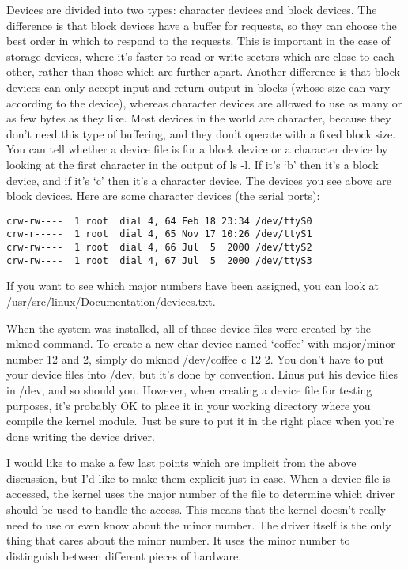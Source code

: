 \documentclass[10pt, oneside]{book}
\begin{document}
\begin{enumerate}
Devices are divided into two types: character devices and block devices. The difference is that block devices have a buffer for requests, so they can choose the best order in which to respond to the requests. This is important in the case of storage devices, where it's faster to read or write sectors which are close to each other, rather than those which are further apart. Another difference is that block devices can only accept input and return output in blocks (whose size can vary according to the device), whereas character devices are allowed to use as many or as few bytes as they like. Most devices in the world are character, because they don't need this type of buffering, and they don't operate with a fixed block size. You can tell whether a device file is for a block device or a character device by looking at the first character in the output of ls -l. If it's `b' then it's a block device, and if it's `c' then it's a character device. The devices you see above are block devices. Here are some character devices (the serial ports):

\begin{verbatim}
crw-rw----  1 root  dial 4, 64 Feb 18 23:34 /dev/ttyS0
crw-r-----  1 root  dial 4, 65 Nov 17 10:26 /dev/ttyS1
crw-rw----  1 root  dial 4, 66 Jul  5  2000 /dev/ttyS2
crw-rw----  1 root  dial 4, 67 Jul  5  2000 /dev/ttyS3
\end{verbatim}

If you want to see which major numbers have been assigned, you can look at /usr/src/linux/Documentation/devices.txt.

When the system was installed, all of those device files were created by the mknod command. To create a new char device named `coffee' with major/minor number 12 and 2, simply do mknod /dev/coffee c 12 2. You don't have to put your device files into /dev, but it's done by convention. Linus put his device files in /dev, and so should you. However, when creating a device file for testing purposes, it's probably OK to place it in your working directory where you compile the kernel module. Just be sure to put it in the right place when you're done writing the device driver.

I would like to make a few last points which are implicit from the above discussion, but I'd like to make them explicit just in case. When a device file is accessed, the kernel uses the major number of the file to determine which driver should be used to handle the access. This means that the kernel doesn't really need to use or even know about the minor number. The driver itself is the only thing that cares about the minor number. It uses the minor number to distinguish between different pieces of hardware.


\end{enumerate}
\end{document}
